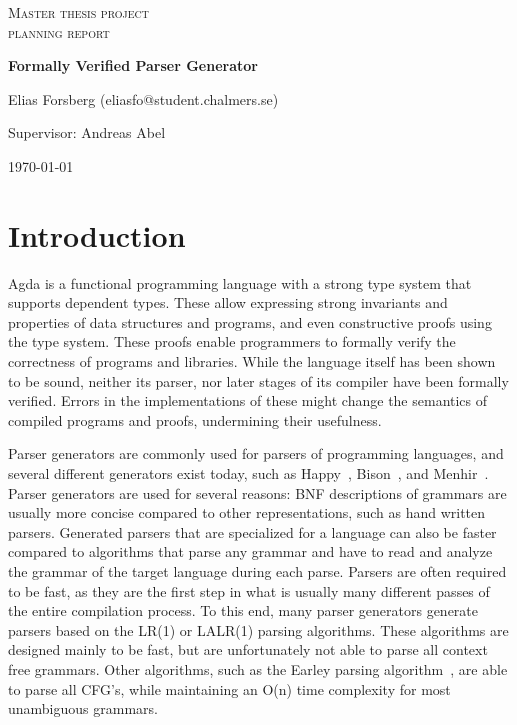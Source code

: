 \documentclass{article}
\begin{document}
\begin{titlepage}


\centering


{\scshape\LARGE Master thesis project \\ planning report\\}

\vspace{0.5cm}

{\huge\bfseries Formally Verified Parser Generator\\}

\vspace{2cm}

{\Large Elias Forsberg (eliasfo@student.chalmers.se)\\}

\vspace{1.0cm}

{\large Supervisor: Andreas Abel\\}

\vfill

{\large \today\\}

\end{titlepage}

\section{Introduction}

	Agda is a functional programming language with a strong type system that
	supports dependent types. These allow expressing strong invariants and
	properties of data structures and programs, and even constructive proofs
	using the type system. These proofs enable programmers to formally verify
	the correctness of programs and libraries. While the language itself has
	been shown to be sound, neither its parser, nor later stages of its
	compiler have been formally verified. Errors in the implementations of
	these might change the semantics of compiled programs and proofs,
	undermining their usefulness.

	Parser generators are commonly used for parsers of programming languages,
	and several different generators exist today, such as Happy~\cite{Happy},
	Bison~\cite{Bison}, and Menhir~\cite{Menhir}. Parser generators are used
	for several reasons: BNF descriptions of grammars are usually more concise
	compared to other representations, such as hand written parsers. Generated
	parsers that are specialized for a language can also be faster compared to
	algorithms that parse any grammar and have to read and analyze the grammar
	of the target language during each parse. Parsers are often required to be
	fast, as they are the first step in what is usually many different passes
	of the entire compilation process. To this end, many parser generators
	generate parsers based on the LR(1) or LALR(1) parsing algorithms. These
	algorithms are designed mainly to be fast, but are unfortunately not able
	to parse all context free grammars.  Other algorithms, such as the Earley
	parsing algorithm~\cite{Earley}, are able to parse all CFG's, while
	maintaining an O(n) time complexity for most unambiguous grammars.
\end{document}
